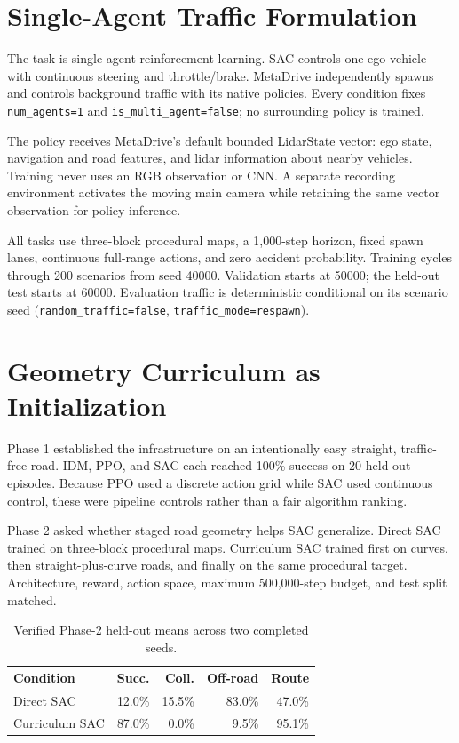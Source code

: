 \documentclass[10pt,twocolumn]{article}
\begin{document}
\section{Single-Agent Traffic Formulation}
The task is single-agent reinforcement learning. SAC controls one ego vehicle with
continuous steering and throttle/brake. MetaDrive independently spawns and controls
background traffic with its native policies. Every condition fixes
\texttt{num\_agents=1} and \texttt{is\_multi\_agent=false}; no surrounding policy is
trained.

The policy receives MetaDrive's default bounded LidarState vector: ego state, navigation
and road features, and lidar information about nearby vehicles. Training never uses an
RGB observation or CNN. A separate recording environment activates the moving main
camera while retaining the same vector observation for policy inference.

All tasks use three-block procedural maps, a 1,000-step horizon, fixed spawn lanes,
continuous full-range actions, and zero accident probability. Training cycles through
200 scenarios from seed 40000. Validation starts at 50000; the held-out test starts at
60000. Evaluation traffic is deterministic conditional on its scenario seed
(\texttt{random\_traffic=false}, \texttt{traffic\_mode=respawn}).

\section{Geometry Curriculum as Initialization}
Phase 1 established the infrastructure on an intentionally easy straight, traffic-free
road. IDM, PPO, and SAC each reached 100\% success on 20 held-out episodes. Because PPO
used a discrete action grid while SAC used continuous control, these were pipeline
controls rather than a fair algorithm ranking.

Phase 2 asked whether staged road geometry helps SAC generalize. Direct SAC trained on
three-block procedural maps. Curriculum SAC trained first on curves, then
straight-plus-curve roads, and finally on the same procedural target. Architecture,
reward, action space, maximum 500,000-step budget, and test split matched.

\begin{table}[t]
\centering
\caption{Verified Phase-2 held-out means across two completed seeds.}
\label{tab:geometry}
\small
\setlength{\tabcolsep}{4pt}
\begin{tabular}{lrrrr}
\toprule
Condition & Succ. & Coll. & Off-road & Route \\
\midrule
Direct SAC & 12.0\% & 15.5\% & 83.0\% & 47.0\% \\
Curriculum SAC & 87.0\% & 0.0\% & 9.5\% & 95.1\% \\
\bottomrule
\end{tabular}
\end{table}
\end{document}
